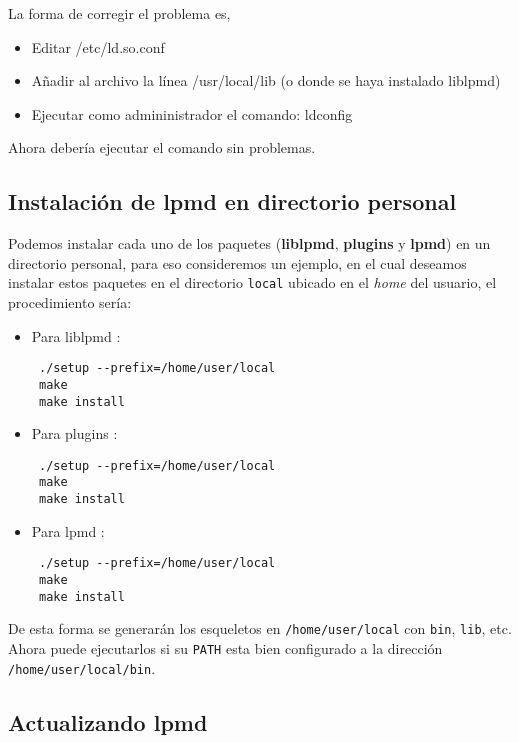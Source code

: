 La forma de corregir el problema es,

\begin{itemize}
 \item Editar /etc/ld.so.conf
 \item A\~nadir al archivo la l\'inea /usr/local/lib (o donde se haya instalado liblpmd)
 \item Ejecutar como admininistrador el comando: ldconfig
\end{itemize}

Ahora deber\'ia ejecutar el comando sin problemas.

\subsection{Instalaci\'on de lpmd en directorio personal}
\label{subsub:personaldir}

Podemos instalar cada uno de los paquetes (\textbf{liblpmd}, \textbf{plugins} y \textbf{lpmd}) en un directorio personal, para eso consideremos un ejemplo, en el cual deseamos instalar estos paquetes en el directorio \verb|local| ubicado en el \textit{home} del usuario, el procedimiento ser\'ia:

\begin{itemize}
 \item Para liblpmd :
 \begin{verbatim}
 ./setup --prefix=/home/user/local
 make
 make install
 \end{verbatim}
 \item Para plugins :
 \begin{verbatim}
 ./setup --prefix=/home/user/local
 make
 make install
 \end{verbatim}
 \item Para lpmd :
 \begin{verbatim}
 ./setup --prefix=/home/user/local
 make
 make install
 \end{verbatim}
\end{itemize}

De esta forma se generar\'an los esqueletos en \verb|/home/user/local| con \verb|bin|, \verb|lib|, etc. Ahora puede ejecutarlos si su \verb|PATH| esta bien configurado a la direcci\'on \verb|/home/user/local/bin|.


\subsection{Actualizando lpmd}

